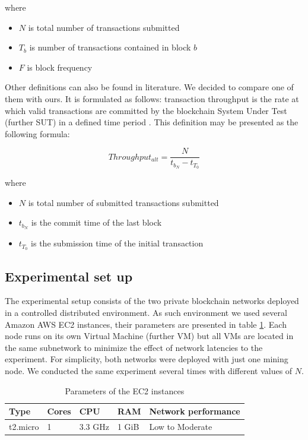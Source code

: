 \documentclass[12pt]{article}
\begin{document}
where
\begin{itemize}
    \item $N$ is total number of transactions submitted
    \item $T_b$ is number of transactions contained in block $b$
    \item $F$ is block frequency
\end{itemize}

Other definitions can also be found in literature. We decided to compare one of them with ours. It is formulated as follows: transaction throughput is the rate at which valid transactions are committed by the blockchain System Under Test (further SUT) in a defined time period \cite{hyperledger_paper}. This definition may be presented as the following formula:

$$Throughput_{alt} = \frac{N}{t_{b_N} - t_{T_0}}$$

where
\begin{itemize}
    \item $N$ is total number of submitted transactions submitted
    \item $t_{b_N}$ is the commit time of the last block
    \item $t_{T_0}$ is the submission time of the initial transaction
\end{itemize}

\subsection{Experimental set up}

The experimental setup consists of the two private blockchain networks deployed in a controlled distributed environment. As such environment we used several Amazon AWS EC2 instances, their parameters are presented in table \ref{instance_params}. Each node runs on its own Virtual Machine (further VM) but all VMs are located in the same subnetwork to minimize the effect of network latencies to the experiment. For simplicity, both networks were deployed with just one mining node. We conducted the same experiment several times with different values of $N$.

\begin{table}[ht]
    \centering
    \begin{tabular}{|l|l|l|l|l|}
        \hline
        Type & Cores & CPU & RAM & Network performance \\
        \hline
        t2.micro & 1 & 3.3 GHz & 1 GiB & Low to Moderate \\
        \hline
    \end{tabular}
    \caption{Parameters of the EC2 instances \cite{ec2_params}}
    \label{instance_params}
\end{table}
\end{document}
